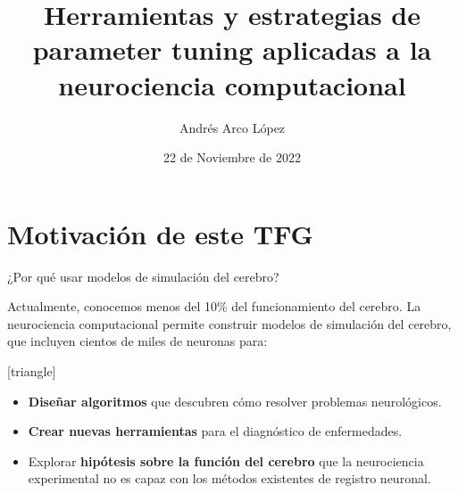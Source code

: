 \documentclass{beamer}
\title[Neurociencia computacional]{Herramientas y estrategias de parameter tuning aplicadas a la neurociencia computacional} %
\author{Andrés Arco López} %
\institute[UGR] %
{
  Universidad de Granada \\ %
  \medskip
  \textit{Grado en Ingeniería Informática} %
}
\date{22 de Noviembre de $2022$} %
\begin{document}





\section{Motivación de este TFG} 


\begin{frame}{¿Por qué usar modelos de simulación del cerebro?}

Actualmente, conocemos menos del 10\% del funcionamiento del cerebro. La neurociencia computacional permite construir modelos de simulación del cerebro, que incluyen cientos de miles de neuronas para:

\vfill
\pause
{}[triangle]
\begin{itemize}
    \item \textbf{Diseñar algoritmos} que descubren cómo resolver problemas neurológicos.
    \vspace{2mm}
    \pause
    \item \textbf{Crear nuevas herramientas} para el diagnóstico de enfermedades.
    \vspace{2mm}
    \pause
    \item Explorar \textbf{hipótesis sobre la función del cerebro} que la neurociencia experimental no es capaz con los métodos existentes de registro neuronal.
    \vspace{2mm}  
\end{itemize}

\vspace{5mm}

\end{frame}
\end{document}
